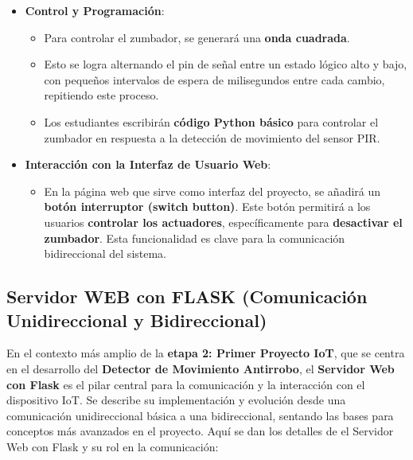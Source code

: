 \documentclass{report}
\begin{document}
\begin{itemize}
    \item \textbf{Control y Programación}:
    \begin{itemize}
        \item Para controlar el zumbador, se generará una \textbf{onda cuadrada}.
        \item Esto se logra alternando el pin de señal entre un estado lógico alto y bajo, con pequeños intervalos de espera de milisegundos entre cada 
        cambio, repitiendo este proceso.
        \item Los estudiantes escribirán \textbf{código Python básico} para controlar el zumbador en respuesta a la detección de movimiento del sensor PIR.
    \end{itemize}

    \item \textbf{Interacción con la Interfaz de Usuario Web}:
    \begin{itemize}
        \item En la página web que sirve como interfaz del proyecto, se añadirá un \textbf{botón interruptor (switch button)}. Este botón permitirá a 
        los usuarios \textbf{controlar los actuadores}, específicamente para \textbf{desactivar el zumbador}. Esta funcionalidad es clave para la 
        comunicación bidireccional del sistema.
    \end{itemize}
\end{itemize}

\subsection{Servidor WEB con FLASK (Comunicación Unidireccional y Bidireccional)}
En el contexto más amplio de la \textbf{etapa 2: Primer Proyecto IoT}, que se centra en el desarrollo del \textbf{Detector de Movimiento Antirrobo}, el 
\textbf{Servidor Web con Flask} es el pilar central para la comunicación y la interacción con el dispositivo IoT. Se describe su implementación y 
evolución desde una comunicación unidireccional básica a una bidireccional, sentando las bases para conceptos más avanzados en el proyecto. Aquí se dan los 
detalles de el Servidor Web con Flask y su rol en la comunicación:
\end{document}
